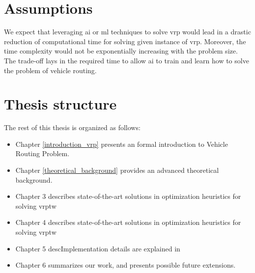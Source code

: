 \begin{introduction}
    \section{Assumptions} 
    We expect that leveraging \gls{ai} or \gls{ml} techniques to solve \gls{vrp} would lead in a drastic reduction of computational time for solving given instance of \gls{vrp}. Moreover, the time complexity would not be exponentially increasing with the problem size. The trade-off lays in the required time to allow \gls{ai} to train and learn how to solve the problem of vehicle routing.
    
    \section{Thesis structure}
    The rest of this thesis is organized as follows:
    \begin{itemize}
        \item Chapter \ref{introduction_vrp} presents an formal introduction to Vehicle Routing Problem.
        \item Chapter \ref{theoretical_background} provides an advanced theoretical background.
        \item Chapter 3 describes state-of-the-art solutions in optimization heuristics for solving \gls{vrptw}
        \item Chapter 4 describes state-of-the-art solutions in optimization heuristics for solving \gls{vrptw}
        \item Chapter 5 descImplementation details are explained in
        \item Chapter 6 summarizes our work, and presents possible future extensions.
    \end{itemize}
\end{introduction}
